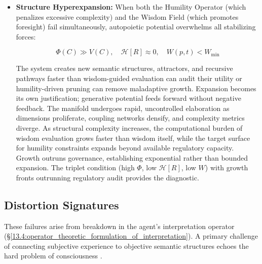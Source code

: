 \begin{itemize}
    \item \textbf{Structure Hyperexpansion:} When both the Humility Operator (which penalizes excessive complexity) and the Wisdom Field (which promotes foresight) fail simultaneously, autopoietic potential overwhelms all stabilizing forces:

    \begin{equation}
    \Phi(C) \gg V(C), \quad \mathcal{H}[R] \approx 0, \quad W(p,t) < W_{\text{min}}
    \end{equation}

    The system creates new semantic structures, attractors, and recursive pathways faster than wisdom-guided evaluation can audit their utility or humility-driven pruning can remove maladaptive growth. Expansion becomes its own justification; generative potential feeds forward without negative feedback. The manifold undergoes rapid, uncontrolled elaboration as dimensions proliferate, coupling networks densify, and complexity metrics diverge. As structural complexity increases, the computational burden of wisdom evaluation grows faster than wisdom itself, while the target surface for humility constraints expands beyond available regulatory capacity. Growth outruns governance, establishing exponential rather than bounded expansion. The triplet condition (high \(\Phi\), low \(\mathcal{H}[R]\), low \(W\)) with growth fronts outrunning regulatory audit provides the diagnostic.

\end{itemize}


\subsection{Distortion Signatures}
\label{16.2.4:distortion_signatures}

These failures arise from breakdown in the agent's interpretation operator (\S\ref{13.4:operator_theoretic_formulation_of_interpretation}). A primary challenge of connecting subjective experience to objective semantic structures echoes the hard problem of consciousness \autocite{Chalmers1996}.

